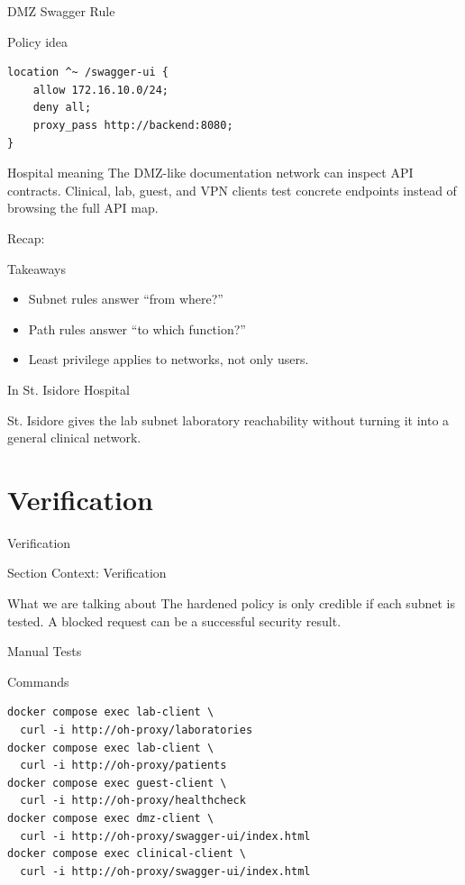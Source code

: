 \documentclass[presentation]{beamer}
\newcommand{\sectiontitleframe}[1]{
\begin{frame}[plain,c]
\begin{center}
{\usebeamerfont{title}\usebeamercolor[fg]{title}#1}
\end{center}
\end{frame}
}
\newcommand{\scenario}{St. Isidore Hospital}
\newcommand{\takeawaysframe}[2]{
\begin{frame}[c]{Recap: \insertsection}
\begin{block}{Takeaways}
#1
\end{block}
\begin{exampleblock}{In \scenario}
#2
\end{exampleblock}
\end{frame}
}
\begin{document}
\begin{frame}[fragile,c]{DMZ Swagger Rule}
\begin{block}{Policy idea}
\begin{verbatim}
location ^~ /swagger-ui {
    allow 172.16.10.0/24;
    deny all;
    proxy_pass http://backend:8080;
}
\end{verbatim}
\end{block}

\begin{exampleblock}{Hospital meaning}
The DMZ-like documentation network can inspect API contracts. Clinical, lab, guest, and VPN clients
test concrete endpoints instead of browsing the full API map.
\end{exampleblock}
\end{frame}

\takeawaysframe{
\begin{itemize}
    \item Subnet rules answer ``from where?''
    \item Path rules answer ``to which function?''
    \item Least privilege applies to networks, not only users.
\end{itemize}
}{
St. Isidore gives the lab subnet laboratory reachability without turning it into a general clinical
network.
}

\section{Verification}
\sectiontitleframe{Verification}

\begin{frame}[c]{Section Context: Verification}
\begin{block}{What we are talking about}
The hardened policy is only credible if each subnet is tested. A blocked request can be a successful
security result.
\end{block}
\end{frame}

\begin{frame}[fragile,c]{Manual Tests}
\begin{block}{Commands}
\begin{verbatim}
docker compose exec lab-client \
  curl -i http://oh-proxy/laboratories
docker compose exec lab-client \
  curl -i http://oh-proxy/patients
docker compose exec guest-client \
  curl -i http://oh-proxy/healthcheck
docker compose exec dmz-client \
  curl -i http://oh-proxy/swagger-ui/index.html
docker compose exec clinical-client \
  curl -i http://oh-proxy/swagger-ui/index.html
\end{verbatim}
\end{block}
\end{frame}
\end{document}

